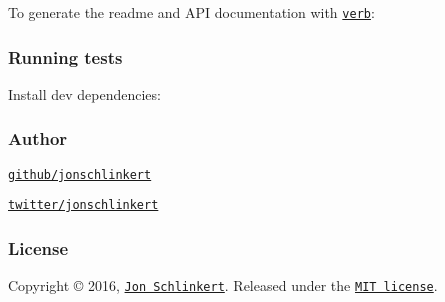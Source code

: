 {\ttfamily To generate the readme and A\+PI documentation with \href{https://github.com/verbose/verb}{\tt verb}\+:}

{\ttfamily 
{}
}

{\ttfamily \subsubsection*{Running tests}}

{\ttfamily }

{\ttfamily Install dev dependencies\+:}

{\ttfamily 
{}
}

{\ttfamily \subsubsection*{Author}}

{\ttfamily }

{}

{\ttfamily 
\begin{DoxyItemize}
\item \href{https://github.com/jonschlinkert}{\tt github/jonschlinkert}
\item \href{http://twitter.com/jonschlinkert}{\tt twitter/jonschlinkert}
\end{DoxyItemize}}

{\ttfamily \subsubsection*{License}}

{\ttfamily }

{\ttfamily Copyright © 2016, \href{https://github.com/jonschlinkert}{\tt Jon Schlinkert}. Released under the \href{https://github.com/jonschlinkert/object.pick/blob/master/LICENSE}{\tt M\+IT license}.}

{\ttfamily 

}

{ }
